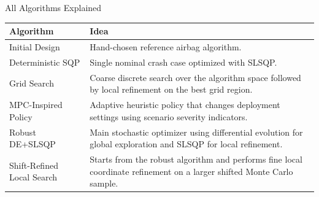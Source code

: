 \documentclass[aspectratio=169]{beamer}
\begin{document}
\begin{frame}{All Algorithms Explained}
  \begin{table}
    \centering
    \scriptsize
    \begin{tabular}{>{\raggedright\arraybackslash}p{3.0cm} >{\raggedright\arraybackslash}p{8.4cm}}
      \toprule
      Algorithm & Idea \\
      \midrule
      Initial Design & Hand-chosen reference airbag algorithm. \\
      Deterministic SQP & Single nominal crash case optimized with SLSQP. \\
      Grid Search & Coarse discrete search over the algorithm space followed by local refinement on the best grid region. \\
      MPC-Inspired Policy & Adaptive heuristic policy that changes deployment settings using scenario severity indicators. \\
      Robust DE+SLSQP & Main stochastic optimizer using differential evolution for global exploration and SLSQP for local refinement. \\
      Shift-Refined Local Search & Starts from the robust algorithm and performs fine local coordinate refinement on a larger shifted Monte Carlo sample. \\
      \bottomrule
    \end{tabular}
  \end{table}
\end{frame}
\end{document}
